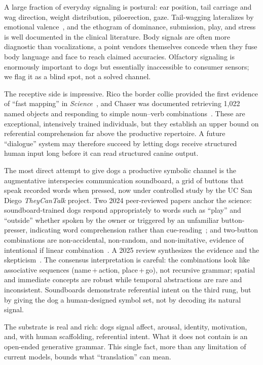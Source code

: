 A large fraction of everyday signaling is postural: ear position, tail
carriage and wag direction, weight distribution, piloerection, gaze.
Tail-wagging lateralizes by emotional valence~\cite{quaranta2007tail}, and
the ethogram of dominance, submission, play, and stress is well documented
in the clinical literature. Body signals are often more diagnostic than
vocalizations, a point vendors themselves concede when they fuse body
language and face to reach claimed accuracies. Olfactory signaling is
enormously important to dogs but essentially inaccessible to consumer
sensors; we flag it as a blind spot, not a solved channel.

The receptive side is impressive. Rico the border collie provided the first
evidence of ``fast mapping'' in \emph{Science}~\cite{kaminski2004rico}, and
Chaser was documented retrieving 1{,}022 named objects and responding to
simple noun--verb combinations~\cite{pilley2011chaser}. These are
exceptional, intensively trained individuals, but they establish an upper
bound on referential comprehension far above the productive repertoire. A
future ``dialogue'' system may therefore succeed by letting dogs receive
structured human input long before it can read structured canine output.

The most direct attempt to give dogs a productive symbolic channel is the
augmentative interspecies communication soundboard, a grid of buttons that
speak recorded words when pressed, now under controlled study by the UC San
Diego \emph{TheyCanTalk} project. Two 2024 peer-reviewed papers anchor the
science: soundboard-trained dogs respond appropriately to words such as
``play'' and ``outside'' whether spoken by the owner or triggered by an
unfamiliar button-presser, indicating word comprehension rather than
cue-reading~\cite{bastos2024plos}; and two-button combinations are
non-accidental, non-random, and non-imitative, evidence of intentional if
linear combination~\cite{bastos2024scirep}. A 2025 review synthesizes the
evidence and the skepticism~\cite{animalcog2025review}. The consensus
interpretation is careful: the combinations look like associative sequences
(name\,+\,action, place\,+\,go), not recursive grammar; spatial and immediate
concepts are robust while temporal abstractions are rare and inconsistent.
Soundboards demonstrate referential intent on the third rung, but by giving
the dog a human-designed symbol set, not by decoding its natural signal.

The substrate is real and rich: dogs signal affect, arousal, identity,
motivation, and, with human scaffolding, referential intent. What it does
not contain is an open-ended generative grammar. This single fact, more
than any limitation of current models, bounds what ``translation'' can
mean.

